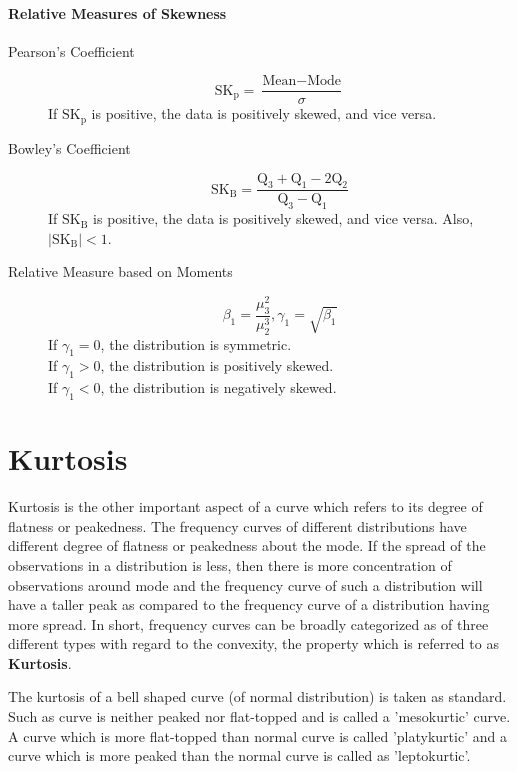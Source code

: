 \documentclass[
10pt, %
a4paper, %
]{report}
\begin{document}
\paragraph*{Relative Measures of Skewness}
\begin{description}
\item[Pearson's Coefficient]
\[\text{SK}_\text{p} = \frac{\text{Mean} - \text{Mode}}{\sigma} \]
If \(\text{SK}_\text{p}\) is positive, the data is positively skewed, and vice versa.
\item[Bowley's Coefficient]
\[\text{SK}_\text{B} = \frac{\mathrm{Q}_3+\mathrm{Q}_1 - 2\mathrm{Q}_2}{\mathrm{Q}_3 - \mathrm{Q}_1} \]
If \(\text{SK}_\text{B}\) is positive, the data is positively skewed, and vice versa. Also, \(|\text{SK}_\text{B}|<1\).
\item[Relative Measure based on Moments]
\[\beta_1 = \dfrac{\mu_3^2}{\mu_2^3}, \gamma_1 = \sqrt{\beta_1} \]
If \(\gamma_1 = 0\), the distribution is symmetric. \\
If \(\gamma_1 > 0\), the distribution is positively skewed.\\
If \(\gamma_1 < 0\), the distribution is negatively skewed.\\
\end{description}

\section*{Kurtosis}

Kurtosis is the other important aspect of a curve which refers to its degree of flatness or peakedness. The frequency curves of different distributions have different degree of flatness or peakedness about the mode. If the spread of the observations in a distribution is less, then there is more concentration of observations around mode and the frequency curve of such a distribution will have a taller peak as compared to the frequency curve of a distribution having more spread. In short, frequency curves can be broadly categorized as of three different types with regard to the convexity, the property which is referred to as \textbf{Kurtosis}.

The kurtosis of a bell shaped curve (of normal distribution) is taken as standard. Such as curve is neither peaked nor flat-topped and is called a 'mesokurtic' curve. A curve which is more flat-topped than normal curve is called 'platykurtic' and a curve which is more peaked than the normal curve is called as 'leptokurtic'.
\end{document}
